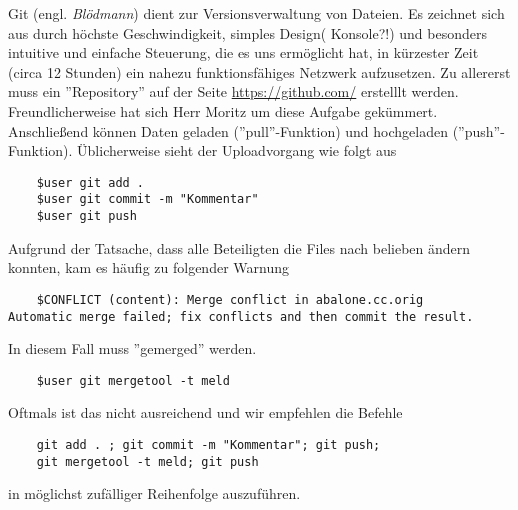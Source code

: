 Git (engl. \textit{Blödmann}) dient zur Versionsverwaltung von Dateien.
Es zeichnet sich aus durch höchste Geschwindigkeit, simples Design( Konsole?!) und
besonders intuitive und einfache Steuerung, die es uns ermöglicht hat, in kürzester Zeit (circa 12 Stunden) 
ein nahezu funktionsfähiges Netzwerk aufzusetzen.
Zu allererst muss ein ''Repository'' auf der Seite \url{https://github.com/} erstelllt werden. 
Freundlicherweise hat sich Herr Moritz um diese Aufgabe gekümmert.
Anschließend können Daten geladen (''pull''-Funktion) und hochgeladen (''push''-Funktion).
Üblicherweise sieht der Uploadvorgang wie folgt aus
\begin{verbatim}
	$user git add .
	$user git commit -m "Kommentar"
	$user git push
\end{verbatim}

Aufgrund der Tatsache, dass alle Beteiligten die Files nach belieben ändern konnten, kam es häufig zu 
folgender Warnung
\begin{verbatim}
	$CONFLICT (content): Merge conflict in abalone.cc.orig
Automatic merge failed; fix conflicts and then commit the result.
\end{verbatim}
In diesem Fall muss ''gemerged'' werden.
\begin{verbatim}
	$user git mergetool -t meld
\end{verbatim}
Oftmals ist das nicht ausreichend und wir empfehlen die Befehle
\begin{verbatim}
	git add . ; git commit -m "Kommentar"; git push;
	git mergetool -t meld; git push
\end{verbatim}
in möglichst zufälliger Reihenfolge auszuführen.

